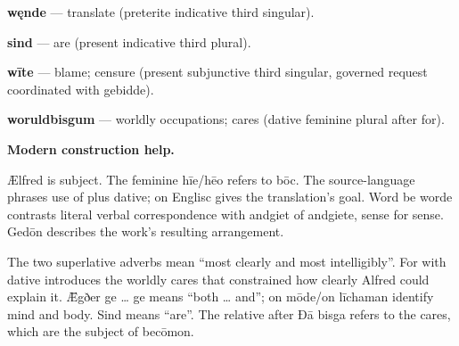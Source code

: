 \textbf{węnde} — translate (preterite indicative third singular).

\textbf{sind} — are (present indicative third plural).

\textbf{wīte} — blame; censure (present subjunctive third singular, governed request coordinated with gebidde).

\textbf{woruldbisgum} — worldly occupations; cares (dative feminine plural after for).

\textbf{Modern construction help.}

Ælfred is subject. The feminine hīe/\allowbreak{}hēo refers to bōc. The source-language phrases use of plus dative; on Englisc gives the translation’s goal. Word be worde contrasts literal verbal correspondence with andgiet of andgiete, sense for sense. Gedōn describes the work’s resulting arrangement.

The two superlative adverbs mean “most clearly and most intelligibly”. For with dative introduces the worldly cares that constrained how clearly Alfred could explain it. Ǣgðer ge … ge means “both … and”; on mōde/\allowbreak{}on līchaman identify mind and body. Sind means “are”. The relative after Ðā bisga refers to the cares, which are the subject of becōmon.

